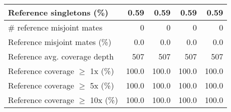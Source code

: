 \documentclass[12pt,a4paper]{article}
\begin{document}
\begin{table}[ht]
\begin{center}
\begin{tabular}{|l*{4}{|r}|}
Reference singletons (\%) & 0.59 & 0.59 & 0.59 & 0.59 \\ \hline
\# reference misjoint mates & 0 & 0 & 0 & 0 \\ \hline
Reference misjoint mates (\%) & 0.0 & 0.0 & 0.0 & 0.0 \\ \hline
Reference avg. coverage depth & 507 & 507 & 507 & 507 \\ \hline
Reference coverage $\geq$ 1x (\%) & 100.0 & 100.0 & 100.0 & 100.0 \\ \hline
Reference coverage $\geq$ 5x (\%) & 100.0 & 100.0 & 100.0 & 100.0 \\ \hline
Reference coverage $\geq$ 10x (\%) & 100.0 & 100.0 & 100.0 & 100.0 \\ \hline
\end{tabular}
\end{center}
\end{table}
\end{document}
